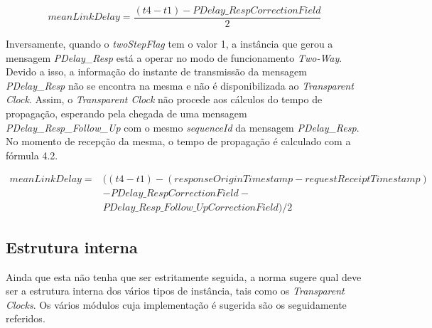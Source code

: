 \begin{equation}
    meanLinkDelay = \dfrac{(t4 - t1) - PDelay\_RespCorrectionField}{2} 
\end{equation}

Inversamente, quando o \textit{twoStepFlag} tem o valor 1, a instância que gerou a mensagem \textit{PDelay\_Resp} está a operar no modo de funcionamento \textit{Two-Way}. Devido a isso, a informação do instante de transmissão da mensagem \textit{PDelay\_Resp} não se encontra na mesma e não é disponibilizada ao \textit{Transparent Clock}. Assim, o \textit{Transparent Clock} não procede aos cálculos do tempo de propagação, esperando pela chegada de uma mensagem \textit{PDelay\_Resp\_Follow\_Up} com o mesmo \textit{sequenceId} da mensagem \textit{PDelay\_Resp}. No momento de recepção da mesma, o tempo de propagação é calculado com a fórmula 4.2.




    \begin{equation}
    \begin{split}
         meanLinkDelay = & ((t4 - t1) - (responseOriginTimestamp -requestReceiptTimestamp ) \\ & - PDelay\_RespCorrectionField - \\ 
    & PDelay\_Resp\_Follow\_UpCorrectionField) / 2
    \end{split}
    \end{equation}
    

\subsection{Estrutura interna}

Ainda que esta não tenha que ser estritamente seguida, a norma sugere qual deve ser a estrutura interna dos vários tipos de instância, tais como os \textit{Transparent Clocks}. Os vários módulos cuja implementação é sugerida são os seguidamente referidos. \par 


